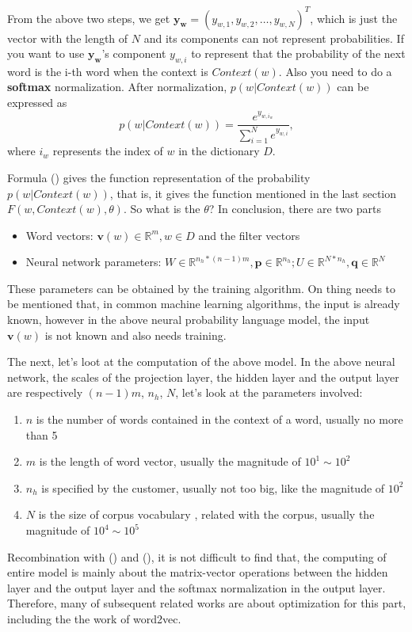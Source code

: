 From the above two steps, we get $\mathbf{y_w}=(y_{w,1},y_{w,2},\ldots,y_{w,N})^T$, which is just the vector with the length of $N$ and its components can not represent probabilities. If you want to use $\mathbf{y_w}$'s component $y_ {w,i}$ to represent that the probability of the next word is the i-th word when the context is $Context(w)$. Also you need to do a \textbf{softmax} normalization. After normalization, $p(w|Context(w))$ can be expressed as
\begin{equation}
p(w|Context(w))=\frac{e^{y_{w,i_w}}}{\sum^N_{i=1}e^{y_{w,i}}},
\end{equation}
where $i_w$ represents the index of $w$ in the dictionary $D$.

Formula () gives the function representation of the probability $p(w|Context(w))$, that is, it gives the function mentioned in the last section $F(w,Context(w),\theta)$. So what is the $\theta$? In conclusion, there are two parts \\
\begin{itemize}
\item Word vectors: $\mathbf{v}(w)\in \mathbb{R}^m, w\in D$ and the filter vectors
\item Neural network parameters: $W\in \mathbb{R}^{n_h*(n-1)m}, \mathbf{p}\in \mathbb{R}^{n_h}; U \in \mathbb{R}^{N*n_h}, \mathbf{q}\in \mathbb{R}^N$
\end{itemize}
These parameters can be obtained by the training algorithm. On thing needs to be mentioned that, in common machine learning algorithms, the input is already known, however in the above neural probability language model, the input $\mathbf{v}(w)$ is not known and also needs training.

The next, let's loot at the computation of the above model. In the above neural network, the scales of the projection layer, the hidden layer and the output layer are respectively $(n-1)m$, $n_h$, $N$, let's look at the parameters involved:
\begin{enumerate}
\item $n$ is the number of words contained in the context of a word, usually no more than 5
\item $m$ is the length of word vector, usually the magnitude of $10^1\sim10^2$
\item $n_h$ is specified by the customer, usually not too big, like the magnitude of $10^2$
\item $N$ is the size of corpus vocabulary , related with the corpus, usually the magnitude of $10^4\sim10^5$  
\end{enumerate}
Recombination with () and (), it is not difficult to find that, the computing of entire model is mainly about the matrix-vector operations between the hidden layer and the output layer and the softmax normalization in the output layer. Therefore, many of subsequent related works are about optimization for this part, including the the work of word2vec. 


